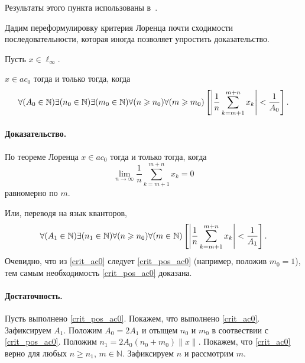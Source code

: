 Результаты этого пункта использованы в~\cite{our-mz2019ac0}.

Дадим переформулировку критерия Лоренца
\cite{lorentz1948contribution,bennett1974consistency}
почти сходимости последовательности,
которая иногда позволяет упростить доказательство.


\begin{theorem}
	Пусть $x\in\ell_\infty$.

	$x\in ac_0$ тогда и только тогда, когда
	\begin{equation}\label{crit_pos_ac0}
		\forall(A_0\in\mathbb{N})
		\exists(n_0\in\mathbb{N})
		\exists(m_0\in\mathbb{N})
		\forall(n\geq n_0)
		\forall(m\geq m_0)
		\\
		\left[
			\left|
			\frac{1}{n}
			\sum_{k=m+1}^{m+n} x_k
			\right|
			<
			\frac{1}{A_0}
		\right]
		.
	\end{equation}

\end{theorem}

\paragraph{Доказательство.}
По теореме Лоренца $x\in ac_0$ тогда и только тогда, когда
\begin{equation}\label{Lorencz_ac0}
	\lim_{n\to\infty} \frac{1}{n} \sum_{k=m+1}^{m+n} x_k = 0
\end{equation}
равномерно по $m$.

Или, переводя на язык кванторов,
\begin{equation}\label{crit_ac0}
	\forall(A_1\in\mathbb{N})
	\exists(n_1\in\mathbb{N})
	\forall(n\geq n_0)
	\forall(m \in \mathbb{N})
	\\
	\left[
		\left|
		\frac{1}{n}
		\sum_{k=m+1}^{m+n} x_k
		\right|
		<
		\frac{1}{A_1}
	\right]
	.
\end{equation}
Очевидно, что из \eqref{crit_ac0} следует \eqref{crit_pos_ac0} (например, положив $m_0 = 1$),
тем самым необходимость \eqref{crit_pos_ac0} доказана.

\paragraph{Достаточность.}
Пусть выполнено \eqref{crit_pos_ac0}.
Покажем, что выполнено \eqref{crit_ac0}.
Зафиксируем $A_1$.
Положим $A_0 = 2A_1$ и отыщем $n_0$ и $m_0$ в соотвествии с \eqref{crit_pos_ac0}.
Положим $n_1 = 2A_0(n_0+m_0)\|x\|$.
Покажем, что \eqref{crit_ac0} верно для любых $n\geq n_1$, $m\in \mathbb{N}$.
Зафиксируем $n$ и рассмотрим $m$.


